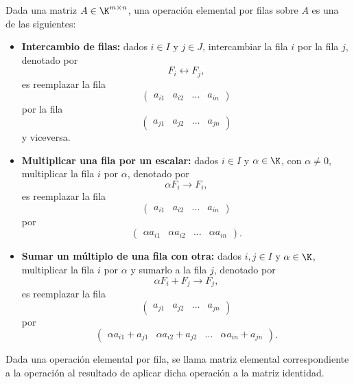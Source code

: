 \documentclass[a4,11pt]{aleph-notas}
\begin{document}
\begin{defi}
    Dada una matriz $A\in\K^{m \times n}$, una operación elemental por filas sobre $A$ es una de las siguientes:
    \begin{itemize}
    \item   
        \textbf{Intercambio de filas:} dados $i\in I$ y $j\in J$, intercambiar la fila $i$ por la fila $j$, denotado por
        \[
            F_i \leftrightarrow F_j,
        \]
        es reemplazar la fila
        \[
            \begin{pmatrix}a_{i1}&a_{i2}&\ldots& a_{in}\end{pmatrix}
        \]
        por la fila
        \[
            \begin{pmatrix}a_{j1}&a_{j2}&\ldots& a_{jn}\end{pmatrix}
        \]
        y viceversa.
    \item 
        \textbf{Multiplicar una fila por un escalar:} dados $i\in I$ y $\alpha\in \K$, con $\alpha\neq 0$, multiplicar la fila $i$ por $\alpha$, denotado por
        \[
            \alpha F_i \rightarrow F_i,
        \]
        es reemplazar la fila
        \[
            \begin{pmatrix}a_{i1}&a_{i2}&\ldots& a_{in}\end{pmatrix}
        \]
        por 
        \[
            \begin{pmatrix}\alpha a_{i1}&\alpha a_{i2}&\ldots&\alpha a_{in}\end{pmatrix}.
        \]
    \item 
        \textbf{Sumar un múltiplo de una fila con otra:} dados $i,j\in I$ y $\alpha\in \K$, multiplicar la fila $i$ por $\alpha$ y sumarlo a la fila $j$, denotado por
        \[
            \alpha F_i + F_j\rightarrow F_j,
        \]
        es reemplazar la fila
        \[
            \begin{pmatrix}a_{j1}&a_{j2}&\ldots& a_{jn}\end{pmatrix}
        \]
        por 
        \[
            \begin{pmatrix}\alpha a_{i1} + a_{j1}&\alpha a_{i2} + a_{j2}&\ldots&\alpha a_{in} + a_{jn}\end{pmatrix}.
        \]
\end{itemize}
\end{defi}

\begin{defi}
    Dada una operación elemental por fila, se llama matriz elemental correspondiente a la operación al resultado de aplicar dicha operación a la matriz identidad.
\end{defi}
\end{document}
